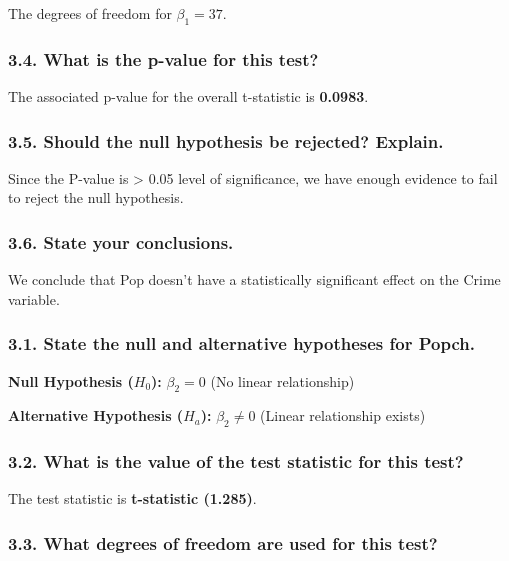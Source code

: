 \documentclass[
]{article}
\begin{document}
The degrees of freedom for \(\beta_1 = 37\).

\subsubsection{3.4. What is the p-value for this
test?}\label{what-is-the-p-value-for-this-test-1}

The associated p-value for the overall t-statistic is \textbf{0.0983}.

\subsubsection{3.5. Should the null hypothesis be rejected?
Explain.}\label{should-the-null-hypothesis-be-rejected-explain.-1}

Since the P-value is \textgreater{} 0.05 level of significance, we have
enough evidence to fail to reject the null hypothesis.

\subsubsection{3.6. State your
conclusions.}\label{state-your-conclusions.-1}

We conclude that Pop doesn't have a statistically significant effect on
the Crime variable.

\subsubsection{3.1. State the null and alternative hypotheses for
Popch.}\label{state-the-null-and-alternative-hypotheses-for-popch.}

\textbf{Null Hypothesis (\(H_0\)):} \(\beta_2 = 0\) (No linear
relationship)

\textbf{Alternative Hypothesis (\(H_a\)):} \(\beta_2 \neq 0\) (Linear
relationship exists)

\subsubsection{3.2. What is the value of the test statistic for this
test?}\label{what-is-the-value-of-the-test-statistic-for-this-test-2}

The test statistic is \textbf{t-statistic (1.285)}.

\subsubsection{3.3. What degrees of freedom are used for this
test?}\label{what-degrees-of-freedom-are-used-for-this-test-2}
\end{document}
